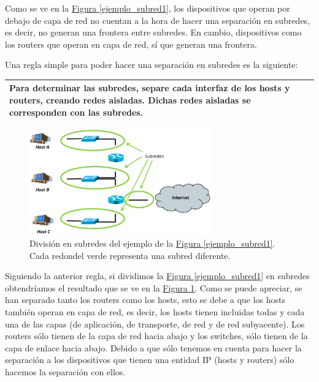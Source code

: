 \documentclass[10pt,a4paper,spanish]{report}
\begin{document}
Como se ve en la \hyperref[ejemplo_subred1]{Figura \ref*{ejemplo_subred1}}, los dispositivos que operan por debajo de capa de red no cuentan a la hora de hacer una separación en subredes, es decir, no generan una frontera entre subredes. En cambio, dispositivos como los routers que operan en capa de red, sí que generan una frontera.

Una regla simple para poder hacer una separación en subredes es la siguiente:
\begin{center}
\begin{tabular}{|p{10.5cm}|}
\hline
 Para determinar las subredes, separe cada interfaz de los hosts y routers, creando redes aisladas. Dichas redes aisladas se corresponden con las subredes. \\
\hline
\end{tabular}
\end{center}

\begin{figure}[!h]
  \centering
  \includegraphics[width=0.7\textwidth]{separacion_subred}
  \caption{División en subredes del ejemplo de la \hyperref[ejemplo_subred1]{Figura \ref*{ejemplo_subred1}}. Cada redondel verde representa una subred diferente.}
  \label{ejemplo_subred2}
\end{figure}

Siguiendo la anterior regla, si dividimos la \hyperref[ejemplo_subred1]{Figura \ref*{ejemplo_subred1}} en subredes obtendríamos el resultado que se ve en la \hyperref[ejemplo_subred2]{Figura \ref*{ejemplo_subred2}}. Como se puede apreciar, se han separado tanto los routers como los hosts, esto se debe a que los hosts también operan en capa de red, es decir, los hosts tienen incluidas todas y cada una de las capas (de aplicación, de transporte, de red y de red subyacente). Los  routers sólo tienen de la capa de red hacia abajo y los switches, sólo tienen de la capa de enlace hacia abajo. Debido a que sólo tenemos en cuenta para hacer la separación a los dispositivos que tienen una entidad IP (hosts y routers) sólo hacemos la separación con ellos. 
\end{document}
